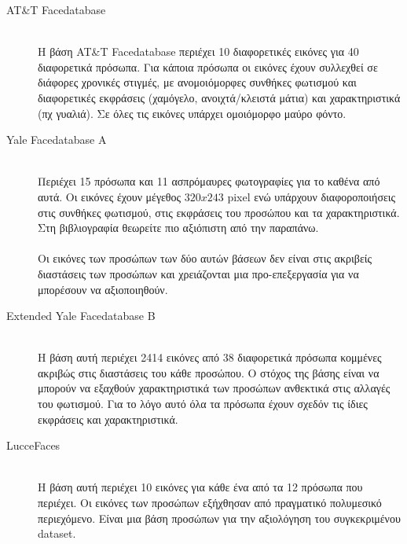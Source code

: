 \begin{description}
  \item[AT\&T Facedatabase] \hfill \\
    Η βάση AT\&T Facedatabase περιέχει 10 διαφορετικές εικόνες για 40 διαφορετικά
    πρόσωπα. Για κάποια πρόσωπα οι εικόνες έχουν συλλεχθεί σε διάφορες χρονικές
    στιγμές, με ανομοιόμορφες συνθήκες φωτισμού και διαφορετικές εκφράσεις (χαμόγελο,
    ανοιχτά/κλειστά μάτια) και χαρακτηριστικά (πχ γυαλιά). Σε όλες τις εικόνες υπάρχει
    ομοιόμορφο μαύρο φόντο.
  \item[Yale Facedatabase A] \hfill \\
    Περιέχει 15 πρόσωπα και 11 ασπρόμαυρες φωτογραφίες για το καθένα από αυτά.
    Οι εικόνες έχουν μέγεθος $320x243$ pixel ενώ υπάρχουν διαφοροποιήσεις στις
    συνθήκες φωτισμού, στις εκφράσεις του προσώπου και τα χαρακτηριστικά. Στη
    βιβλιογραφία θεωρείτε πιο αξιόπιστη από την παραπάνω.\\
    \\
    Οι εικόνες των προσώπων των δύο αυτών βάσεων δεν είναι στις ακριβείς διαστάσεις
    των προσώπων και χρειάζονται μια προ-επεξεργασία για να μπορέσουν να αξιοποιηθούν.
  \item[Extended Yale Facedatabase B] \hfill \\
    Η βάση αυτή περιέχει 2414 εικόνες από 38 διαφορετικά πρόσωπα κομμένες ακριβώς
    στις διαστάσεις του κάθε προσώπου. Ο στόχος της βάσης είναι να μπορούν να εξαχθούν
    χαρακτηριστικά των προσώπων ανθεκτικά στις αλλαγές του φωτισμού. Για το λόγο αυτό
    όλα τα πρόσωπα έχουν σχεδόν τις ίδιες εκφράσεις και χαρακτηριστικά.
  \item[LucceFaces] \hfill \\
    Η βάση αυτή περιέχει 10 εικόνες για κάθε ένα από τα 12 πρόσωπα που περιέχει.
    Οι εικόνες των προσώπων εξήχθησαν από πραγματικό πολυμεσικό περιεχόμενο. Είναι
    μια βάση προσώπων για την αξιολόγηση του συγκεκριμένου dataset.
\end{description}


